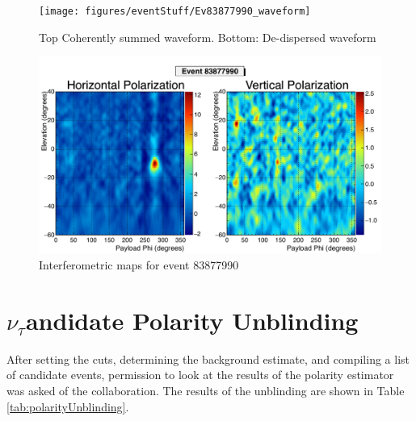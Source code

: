 		
		\begin{figure}
		\centering
			\texttt{[image: figures/eventStuff/Ev83877990\_waveform]}
			\caption{Top Coherently summed waveform.  Bottom: De-dispersed waveform} 
		\label{fig:Ev83877990_waveform}
		\end{figure}
		
		\begin{figure}
		\centering
			\includegraphics[width=\textwidth]{figures/intMap/intMap_ev83877990}
			\caption{Interferometric maps for event 83877990} 
		\label{fig:Ev83877990_map}
		\end{figure}			





\section{\texorpdfstring{$\nu_{\tau}$} Candidate Polarity Unblinding}
	After setting the cuts, determining the background estimate, and compiling a list of candidate events, permission to look at the results of the polarity estimator was asked of the collaboration.  The results of the unblinding are shown in Table \ref{tab:polarityUnblinding}.

